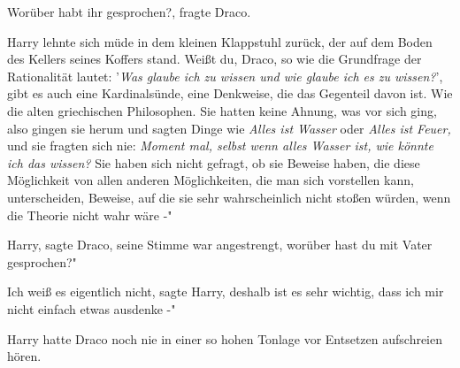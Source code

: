 \glqq Worüber habt ihr gesprochen?\grqq{}, fragte Draco.

Harry lehnte sich müde in dem kleinen Klappstuhl zurück, der auf dem Boden des
Kellers seines Koffers stand. \glqq Weißt du, Draco, so wie die Grundfrage der
Rationalität lautet: '\emph{Was glaube ich zu wissen und wie glaube ich es zu
wissen?}', gibt es auch eine Kardinalsünde, eine Denkweise, die das Gegenteil
davon ist. Wie die alten griechischen Philosophen. Sie hatten keine Ahnung, was
vor sich ging, also gingen sie herum und sagten Dinge wie \emph{\glqq Alles ist
Wasser\grqq{} } oder \emph{\glqq Alles ist Feuer\grqq{},} und sie fragten sich
nie:\emph{ \glqq Moment mal, selbst wenn alles Wasser ist, wie könnte ich das
wissen?} Sie haben sich nicht gefragt, ob sie Beweise haben, die diese
Möglichkeit von allen anderen Möglichkeiten, die man sich vorstellen kann,
unterscheiden, Beweise, auf die sie sehr wahrscheinlich nicht stoßen würden,
wenn die Theorie nicht wahr wäre -"

\glqq Harry\grqq{}, sagte Draco, seine Stimme war angestrengt, \glqq worüber
hast du mit Vater gesprochen?"

\glqq Ich weiß es eigentlich nicht\grqq{}, sagte Harry, \glqq deshalb ist es
sehr wichtig, dass ich mir nicht einfach etwas ausdenke -"

Harry hatte Draco noch nie in einer so hohen Tonlage vor Entsetzen aufschreien
hören.

